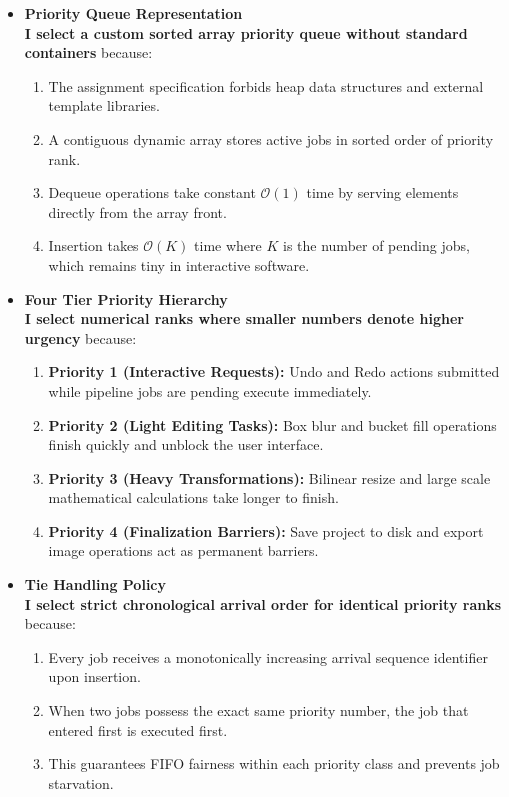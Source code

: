 \documentclass[10pt,a4paper]{article}
\begin{document}
\begin{itemize}[leftmargin=1.2em,noitemsep,topsep=3pt,parsep=2pt]
    \item \textbf{Priority Queue Representation}\\[3pt]
    \textbf{I select a custom sorted array priority queue without standard containers} because:
    \begin{enumerate}[label=\arabic*),leftmargin=1.5em,noitemsep,topsep=1pt,parsep=1pt]
        \item The assignment specification forbids heap data structures and external template libraries.
        \item A contiguous dynamic array stores active jobs in sorted order of priority rank.
        \item Dequeue operations take constant $\mathcal{O}(1)$ time by serving elements directly from the array front.
        \item Insertion takes $\mathcal{O}(K)$ time where $K$ is the number of pending jobs, which remains tiny in interactive software.
    \end{enumerate}

    \item \textbf{Four Tier Priority Hierarchy}\\[3pt]
    \textbf{I select numerical ranks where smaller numbers denote higher urgency} because:
    \begin{enumerate}[label=\arabic*),leftmargin=1.5em,noitemsep,topsep=1pt,parsep=1pt]
        \item \textbf{Priority 1 (Interactive Requests):} Undo and Redo actions submitted while pipeline jobs are pending execute immediately.
        \item \textbf{Priority 2 (Light Editing Tasks):} Box blur and bucket fill operations finish quickly and unblock the user interface.
        \item \textbf{Priority 3 (Heavy Transformations):} Bilinear resize and large scale mathematical calculations take longer to finish.
        \item \textbf{Priority 4 (Finalization Barriers):} Save project to disk and export image operations act as permanent barriers.
    \end{enumerate}

    \item \textbf{Tie Handling Policy}\\[3pt]
    \textbf{I select strict chronological arrival order for identical priority ranks} because:
    \begin{enumerate}[label=\arabic*),leftmargin=1.5em,noitemsep,topsep=1pt,parsep=1pt]
        \item Every job receives a monotonically increasing arrival sequence identifier upon insertion.
        \item When two jobs possess the exact same priority number, the job that entered first is executed first.
        \item This guarantees FIFO fairness within each priority class and prevents job starvation.
    \end{enumerate}


\end{itemize}
\end{document}
